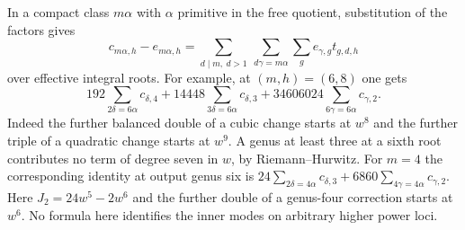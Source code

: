 In a compact class $m\alpha$ with $\alpha$ primitive in the free
quotient, substitution of the factors gives
\[
 c_{m\alpha,h}-e_{m\alpha,h}
 =\sum_{d\mid m,\ d>1}\ \sum_{d\gamma=m\alpha}\sum_g
       e_{\gamma,g}t_{g,d,h}
\]
over effective integral roots. For example, at $(m,h)=(6,8)$ one gets
\[
192\sum_{2\delta=6\alpha}c_{\delta,4}
 +14448\sum_{3\delta=6\alpha}c_{\delta,3}
 +34606024\sum_{6\gamma=6\alpha}c_{\gamma,2}.
\]
Indeed the further balanced double of a cubic change starts at
$w^8$ and the further triple of a quadratic change starts at $w^9$.
A genus at least three at a sixth root contributes no term of degree
seven in $w$, by Riemann--Hurwitz. For $m=4$ the corresponding identity at output genus six is
$24\sum_{2\delta=4\alpha}c_{\delta,3}
+6860\sum_{4\gamma=4\alpha}c_{\gamma,2}$. Here
$J_2=24w^5-2w^6$ and the further double of a genus-four correction
starts at $w^6$. No formula here identifies the inner modes on
arbitrary higher power loci.
